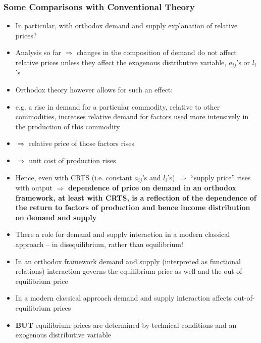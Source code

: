 \documentclass{article}
\begin{document}
\subsubsection{Some Comparisons with Conventional Theory}
	\begin{itemize}
		\item In particular, with orthodox demand and supply explanation of relative prices?
		\item Analysis so far \( \Rightarrow \) changes in the composition of demand do not affect relative prices unless they affect the exogenous distributive variable, \( a_{ij} \)'s or \( l_i \)'s
		\item Orthodox theory however allows for such an effect:
		\item e.g. a rise in demand for a particular commodity, relative to other commodities, increases relative demand for factors used more intensively in the production of this commodity
		\item  \( \Rightarrow \) relative price of those factors rises
		\item \( \Rightarrow \) unit cost of production rises
		\item Hence, even with CRTS (i.e. constant \( a_{ij} \)'s and \( l_i \)'s) \( \Rightarrow \) “supply price'' rises with output
		\( \Rightarrow \) \textbf{dependence of price on demand in an orthodox framework, at least with CRTS, is a reflection of the dependence of the return to factors of production and hence income distribution on demand and supply}
		\item There a role for demand and supply interaction in a modern classical approach -- in disequilibrium, rather than equilibrium!
		\item  In an orthodox framework demand and supply (interpreted as functional relations) interaction governs the equilibrium price as well and the out-of-equilibrium price 
		\item In a modern classical approach demand and supply interaction affects out-of-equilibrium prices
		\item \textbf{BUT} equilibrium prices are determined by technical conditions and an exogenous distributive variable
	\end{itemize}
\end{document}
